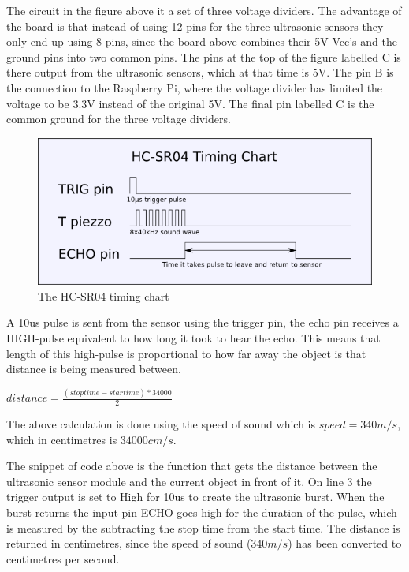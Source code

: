 The circuit in the figure above it a set of three voltage dividers. The advantage of the board is that instead of using 12 pins for the three ultrasonic sensors they only end up using 8 pins, since the board above combines their 5V Vcc's and the ground pins into two common pins.  
The pins at the top of the figure labelled C is there output from the ultrasonic sensors, which at that time is 5V. The pin B is the connection to the Raspberry Pi, where the voltage divider has limited the voltage to be 3.3V instead of the original 5V.  
The final pin labelled C is the common ground for the three voltage dividers.

\begin{figure}[H]
	\centering
	\includegraphics[width=.5\linewidth]{images/hcsr04timingchart.png}
	\caption{The HC-SR04 timing chart\cite{hcsr04timingchart}}
\end{figure}

A 10us pulse is sent from the sensor using the trigger pin, the echo pin receives a HIGH-pulse equivalent to how long it took to hear the echo. This means that length of this high-pulse is proportional to how far away the object is that distance is being measured between.\cite{ultrasonichowitworks}

$distance = \frac{(stoptime-startime) * 34000}{2}$

The above calculation is done using the speed of sound which is $speed = 340m/s$, which in centimetres is $34000cm/s$.



The snippet of code above is the function that gets the distance between the ultrasonic sensor module and the current object in front of it.
On line 3 the trigger output is set to High for 10us to create the ultrasonic burst. When the burst returns the input pin ECHO goes high for the duration of the pulse, which is measured by the subtracting the stop time from the start time.
The distance is returned in centimetres, since the speed of sound ($340m/s$) has been converted to centimetres per second.
